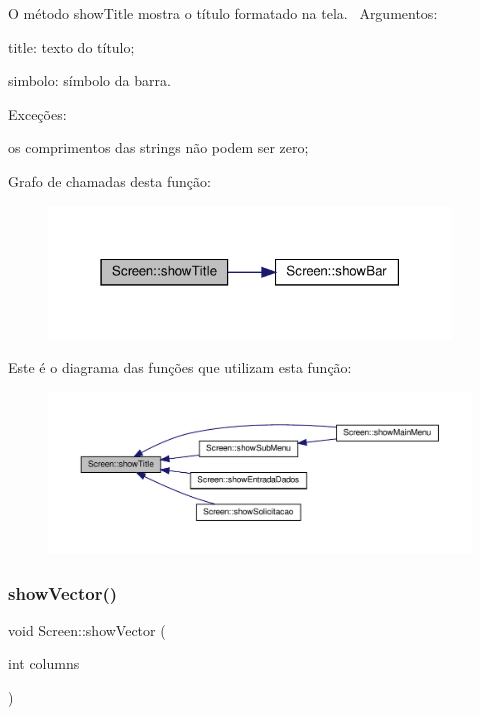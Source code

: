 O método show\+Title mostra o título formatado na tela.~\newline
Argumentos\+:
\begin{DoxyItemize}
\item title\+: texto do título;
\item simbolo\+: símbolo da barra.
\end{DoxyItemize}

Exceções\+:
\begin{DoxyItemize}
\item os comprimentos das strings não podem ser zero;
\end{DoxyItemize}Grafo de chamadas desta função\+:\nopagebreak
\begin{figure}[H]
\begin{center}
\leavevmode
\includegraphics[width=303pt]{classScreen_aefbd91aee5978143823031767159caf7_cgraph}
\end{center}
\end{figure}
Este é o diagrama das funções que utilizam esta função\+:\nopagebreak
\begin{figure}[H]
\begin{center}
\leavevmode
\includegraphics[width=350pt]{classScreen_aefbd91aee5978143823031767159caf7_icgraph}
\end{center}
\end{figure}
\mbox{\label{classScreen_aca2a46f65496651c74b66e807f7ed421}} 
\subsubsection{\texorpdfstring{show\+Vector()}{showVector()}}
{\footnotesize\ttfamily void Screen\+::show\+Vector (\begin{DoxyParamCaption}\item[{int}]{columns }\end{DoxyParamCaption})}

